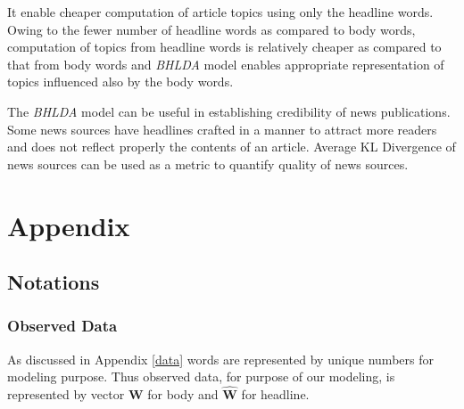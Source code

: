 \documentclass[a4paper]{article}
\begin{document}
It enable cheaper computation of article topics using only the headline words. Owing to the fewer number of headline words as compared to body words, computation of topics from headline words is relatively cheaper as compared to that from body words and \emph{BHLDA} model enables appropriate representation of topics influenced also by the body words.

%


The \emph{BHLDA} model can be useful in establishing credibility of news publications. Some news sources have headlines crafted in a manner to attract more readers and does not reflect properly the contents of an article. Average KL Divergence of news sources can be used as a metric to quantify quality of news sources. 


\section{Appendix}

\subsection{Notations} \label{notations}
\subsubsection{Observed Data}
As discussed in Appendix \ref{data} words are represented by unique numbers for modeling purpose. Thus observed data, for purpose of our modeling, is represented by vector \textbf{W} for body and $\mathbf{\hat{W}}$ for headline. 
\end{document}
